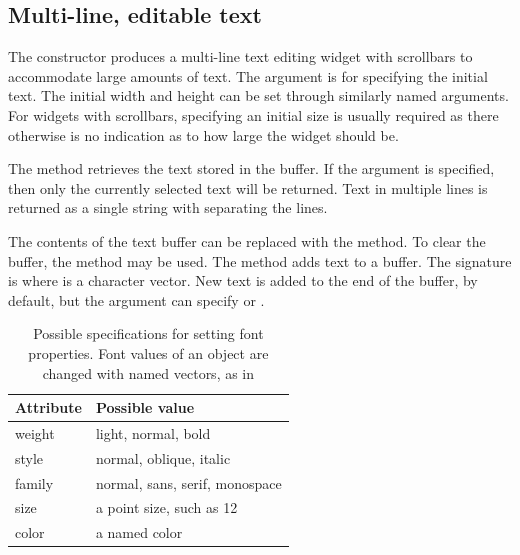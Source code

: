 \subsection{Multi-line, editable text}
\label{sec:gWidgets-multi-line-editable}

The  constructor produces a multi-line text editing
widget with scrollbars to accommodate large amounts of text. The
 argument is for specifying the initial text. The
initial width and height can be set through similarly named
arguments. For widgets with scrollbars, specifying an initial size is
usually required as there otherwise is no indication as to how large
the widget should be.

The  method retrieves the text stored in the
buffer. If the argument  is specified, then only the
currently selected text will be returned. Text in multiple lines is
returned as a single string with \qcode{\backslashn} separating the lines.

The contents of the text buffer can be replaced with the
 method. To clear the buffer, the
 method may be used. The 
method adds text to a buffer. The signature is  where  is a character vector. New text
is added to the end of the buffer, by default, but the
 argument can specify  or
.





\begin{table}
\centering
\label{tab:gWidgets-font-properties}
\caption{Possible specifications for setting font properties. Font values of an object are changed with named vectors, as in }
\begin{tabular}{@{}lp{}@{}}
\toprule

Attribute&Possible value\\
\midrule
weight&light, normal, bold\\style&normal, oblique, italic\\family&normal, sans, serif, monospace\\size&a point size, such as 12\\color&a named color
\\ \bottomrule
\end{tabular}
\end{table}
